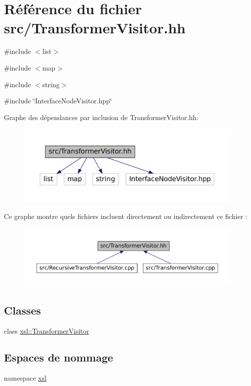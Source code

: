 \hypertarget{_transformer_visitor_8hh}{
\section{Référence du fichier src/TransformerVisitor.hh}
\label{_transformer_visitor_8hh}
}
{\ttfamily \#include $<$list$>$}\par
{\ttfamily \#include $<$map$>$}\par
{\ttfamily \#include $<$string$>$}\par
{\ttfamily \#include \char`\"{}InterfaceNodeVisitor.hpp\char`\"{}}\par
Graphe des dépendances par inclusion de TransformerVisitor.hh:\nopagebreak
\begin{figure}[H]
\begin{center}
\leavevmode
\includegraphics[width=400pt]{_transformer_visitor_8hh__incl}
\end{center}
\end{figure}
Ce graphe montre quels fichiers incluent directement ou indirectement ce fichier :\nopagebreak
\begin{figure}[H]
\begin{center}
\leavevmode
\includegraphics[width=400pt]{_transformer_visitor_8hh__dep__incl}
\end{center}
\end{figure}
\subsection*{Classes}
\begin{DoxyCompactItemize}
\item 
class \hyperlink{classxsl_1_1_transformer_visitor}{xsl::TransformerVisitor}
\end{DoxyCompactItemize}
\subsection*{Espaces de nommage}
\begin{DoxyCompactItemize}
\item 
namespace \hyperlink{namespacexsl}{xsl}
\end{DoxyCompactItemize}
